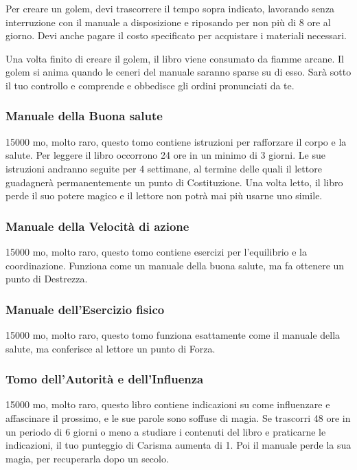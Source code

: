 \begin{multicols}{2}
\medskip

Per creare un golem, devi trascorrere il tempo sopra indicato, lavorando senza interruzione con il manuale a disposizione e riposando per non più di 8 ore al giorno. Devi anche pagare il costo specificato per acquistare i materiali necessari.

Una volta finito di creare il golem, il libro viene consumato da fiamme arcane. Il golem si anima quando le ceneri del manuale saranno sparse su di esso. Sarà sotto il tuo controllo e comprende e obbedisce gli ordini pronunciati da te.

\subsubsection*{Manuale della Buona salute}
15000 mo, molto raro, questo tomo contiene istruzioni per rafforzare il corpo e la salute. Per leggere il libro occorrono 24 ore in un minimo di 3 giorni. Le sue istruzioni andranno seguite per 4 settimane, al termine delle quali il lettore guadagnerà permanentemente un punto di Costituzione. Una volta letto, il libro perde il suo potere magico e il lettore non potrà mai più usarne uno simile.

\subsubsection*{Manuale della Velocità di azione}
15000 mo, molto raro, questo tomo contiene esercizi per l'equilibrio e la coordinazione. Funziona come un manuale della buona salute, ma fa ottenere un punto di Destrezza.

\subsubsection*{Manuale dell'Esercizio fisico}
15000 mo, molto raro, questo tomo funziona esattamente come il manuale della salute, ma conferisce al lettore un punto di Forza.

\subsubsection*{Tomo dell'Autorità e dell'Influenza}
15000 mo, molto raro, questo libro contiene indicazioni su come influenzare e affascinare il prossimo, e le sue parole sono soffuse di magia. Se trascorri 48 ore in un periodo di 6 giorni o meno a studiare i contenuti del libro e praticarne le indicazioni, il tuo punteggio di Carisma aumenta di 1. Poi il manuale perde la sua magia, per recuperarla dopo un secolo.


\end{multicols}
